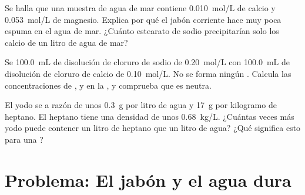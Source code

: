 \begin{exercise}[$\star\star\star$]\label{exo:g11:dissolution:13}
Se halla que una muestra de agua de mar contiene \qty{0.010}{mol/L} de
 calcio y \qty{0.053}{mol/L} de  magnesio. Explica por qué el
jabón corriente hace muy poca espuma en el agua de mar. ¿Cuánto
estearato de sodio precipitarían solo los  calcio de un litro de
agua de mar?
\end{exercise}

\begin{exercise}[$\star\star\star$]\label{exo:g11:dissolution:14}
Se  \qty{100.0}{mL} de disolución de cloruro de sodio de
\qty{0.20}{mol/L} con \qty{100.0}{mL} de disolución de cloruro de calcio
de \qty{0.10}{mol/L}. No se forma ningún . Calcula las
concentraciones de ,  y  en la , y
comprueba que es neutra.
\end{exercise}

\begin{exercise}[$\star\star\star$]\label{exo:g11:dissolution:15}
El yodo se  a razón de unos \qty{0.3}{g} por litro de agua y
\qty{17}{g} por kilogramo de heptano. El heptano tiene una densidad de
unos \qty{0.68}{kg/L}. ¿Cuántas veces más yodo puede contener un litro
de heptano que un litro de agua? ¿Qué significa esto para una
?
\end{exercise}

\section{Problema: El jabón y el agua dura}

